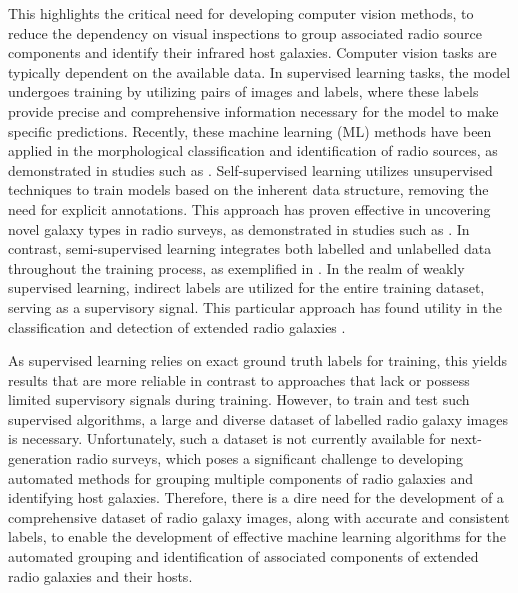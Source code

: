 \documentclass[
  journal=pasa,
  manuscript=research-paper, %
  year=2020,
  volume=37,
]{cup-journal}
\begin{document}
This highlights the critical need for developing computer vision methods, to reduce the dependency on visual inspections to group associated radio source components and identify their infrared host galaxies.
Computer vision tasks are typically dependent on the available data. 
In supervised learning tasks, the model undergoes training by utilizing pairs of images and labels, where these labels provide precise and comprehensive information necessary for the model to make specific predictions.
Recently, these machine learning (ML) methods have been applied in the morphological classification and identification of radio sources, as demonstrated in studies such as \citep[e.g.][]{lukic18, alger18,wu19,bowles20,viera21,becker21,brand23}.
Self-supervised learning utilizes unsupervised techniques to train models based on the inherent data structure, removing the need for explicit annotations. This approach has proven effective in uncovering novel galaxy types in radio surveys, as demonstrated in studies such as \citep[e.g.][]{galvin20, mostert21, gupta22}.
In contrast, semi-supervised learning integrates both labelled and unlabelled data throughout the training process, as exemplified in \citet{slijepcevic22}.
In the realm of weakly supervised learning, indirect labels are utilized for the entire training dataset, serving as a supervisory signal. This particular approach has found utility in the classification and detection of extended radio galaxies \citep[][]{gupta2023a}.

As supervised learning relies on exact ground truth labels for training, this yields results that are more reliable in contrast to approaches that lack or possess limited supervisory signals during training.
However, to train and test such supervised algorithms, a large and diverse dataset of labelled radio galaxy images is necessary. Unfortunately, such a dataset is not currently available for next-generation radio surveys, which poses a significant challenge to developing automated methods for grouping multiple components of radio galaxies and identifying host galaxies. 
Therefore, there is a dire need for the development of a comprehensive dataset of radio galaxy images, along with accurate and consistent labels, to enable the development of effective machine learning algorithms for the automated grouping and identification of associated components of extended radio galaxies and their hosts.
\end{document}
